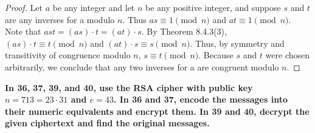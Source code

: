 \documentclass[14pt]{extarticle}
\newcommand{\cy}{\color{cyan}}
\begin{document}
\begin{proof}
        Let $a$ be any integer and let $n$ be any positive integer, and suppose $s$ and $t$ are any inverses for a modulo $n$. Thus \(as \equiv 1 \pmod n\) and \(at \equiv 1 \pmod n\). Note that \(ast = (as) \cdot t = (at) \cdot s\). By Theorem
        8.4.3(3), \((as) \cdot t \equiv t \pmod n\) and \((at) \cdot s \equiv s \pmod n\). Thus, by symmetry and
        transitivity of congruence modulo $n$, \(s \equiv t \pmod n\). Because $s$ and $t$ were chosen arbitrarily, we
        conclude that any two inverses for a are congruent modulo $n$.
\end{proof}

{\bf \cy In 36, 37, 39, and 40, use the RSA cipher with public key \(n = 713 = 23 \cdot 31\) and \(e = 43\). In 36
and 37, encode the messages into their numeric equivalents and encrypt them. In 39 and 40, decrypt the given
ciphertext and find the original messages.}
\end{document}
